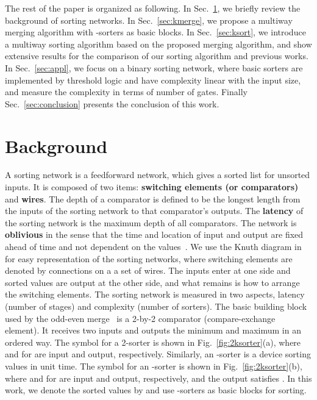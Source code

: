 \documentclass[10pt,journal,cspaper,compsoc]{IEEEtran}
\begin{document}
The rest of the paper is organized as following. In Sec.~\ref{sec:bg}, we briefly review the background of sorting networks. In Sec.~\ref{sec:kmerge}, we propose a multiway merging algorithm with -sorters as basic blocks. In Sec.~\ref{sec:ksort}, we introduce a multiway sorting algorithm based on the proposed merging algorithm, and show extensive results for the comparison of our sorting algorithm and previous works. In Sec.~\ref{sec:appl}, we focus on a binary sorting network, where basic sorters are implemented by threshold logic and have complexity linear with the input size, and measure the complexity in terms of number of gates. Finally Sec.~\ref{sec:conclusion} presents the conclusion of this work.



\section{Background}
\label{sec:bg}
A sorting network is a feedforward network, which gives a sorted list for unsorted inputs. It is composed of two items: \textbf{switching elements (or comparators)} and \textbf{wires}. The depth of a comparator is defined to be the longest length from the inputs of the sorting network to that comparator's outputs. The \textbf{latency} of the sorting network is the maximum depth of all comparators.
The network is \textbf{oblivious} in the sense that the time and location of input and output are fixed ahead of time and not dependent on the values~\cite{Bat68sorting}.
We use the Knuth diagram in \cite{knuth1973art} for easy representation of the sorting networks, where switching elements are denoted by connections on a a set of wires. The inputs enter at one side and sorted values are output at the other side, and what remains is how to arrange the switching elements. The sorting network is measured in two aspects, latency (number of stages) and complexity (number of sorters).
The basic building block used by the odd-even merge~\cite{Bat68sorting} is a 2-by-2 comparator (compare-exchange element). It receives two inputs and outputs the minimum and maximum in an ordered way.
The symbol for a 2-sorter is shown in Fig.~\ref{fig:2ksorter}(a), where  and  for  are input and output, respectively.
Similarly, an -sorter is a device sorting  values in unit time. The symbol for an -sorter is shown in Fig.~\ref{fig:2ksorter}(b), where  and  for  are input and output, respectively, and the output satisfies .
In this work, we denote the sorted values  by  and use -sorters as basic blocks for sorting.
\end{document}
